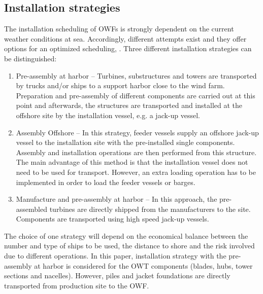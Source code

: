 \subsection{Installation strategies}
The installation scheduling of OWFs is strongly dependent on the current weather conditions at sea. Accordingly, different attempts exist and they offer options for an optimized scheduling, \cite{Thalemann2012}. Three different installation strategies can be distinguished:

\begin{enumerate}
\item Pre-assembly at harbor -- Turbines, substructures and towers are transported by trucks and/or ships to a support harbor close to the wind farm. Preparation and pre-assembly of different components are carried out at this point and afterwards, the structures are transported and installed at the offshore site by the installation vessel, e.g. a jack-up vessel.
\item Assembly Offshore -- In this strategy, feeder vessels supply an offshore jack-up vessel to the installation site with the pre-installed single components. Assembly and installation operations are then performed from this structure. The main advantage of this method is that the installation vessel does not need to be used for transport. However, an extra loading operation has to be implemented in order to load the feeder vessels or barges.
\item Manufacture and pre-assembly at harbor -- In this approach, the pre-assembled turbines are directly shipped from the manufacturers to the site. Components are transported using high speed jack-up vessels.
\end{enumerate}

The choice of one strategy will depend on the economical balance between the number and type of ships to be used, the distance to shore and the risk involved due to different operations. In this paper, installation strategy with the pre-assembly at harbor is considered for the OWT components (blades, hubs, tower sections and nacelles). However, piles and jacket foundations are directly transported from production site to the OWF. 